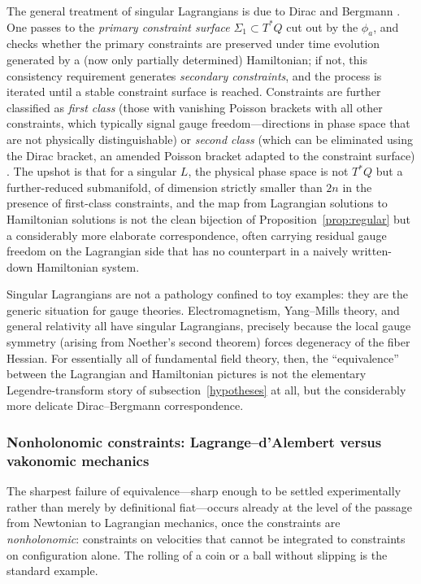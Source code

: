 The general treatment of singular Lagrangians is due to Dirac and Bergmann
\cite{dirac1964}. One passes to the \emph{primary constraint surface}
$\Sigma_1 \subset T^*Q$ cut out by the $\phi_a$, and checks whether the primary
constraints are preserved under time evolution generated by a (now only
partially determined) Hamiltonian; if not, this consistency requirement
generates \emph{secondary constraints}, and the process is iterated until a
stable constraint surface is reached. Constraints are further classified as
\emph{first class} (those with vanishing Poisson brackets with all other
constraints, which typically signal gauge freedom---directions in phase space
that are not physically distinguishable) or \emph{second class} (which can be
eliminated using the Dirac bracket, an amended Poisson bracket adapted to the
constraint surface) \cite{henneauxteitelboim1992}. The upshot is that for a
singular $L$, the physical phase space is not $T^*Q$ but a further-reduced
submanifold, of dimension strictly smaller than $2n$ in the presence of
first-class constraints, and the map from Lagrangian solutions to Hamiltonian
solutions is not the clean bijection of Proposition~\ref{prop:regular} but a
considerably more elaborate correspondence, often carrying residual gauge
freedom on the Lagrangian side that has no counterpart in a naively
written-down Hamiltonian system.

Singular Lagrangians are not a pathology confined to toy examples: they are the
generic situation for gauge theories. Electromagnetism, Yang--Mills theory, and
general relativity all have singular Lagrangians, precisely because the local
gauge symmetry (arising from Noether's second theorem) forces degeneracy of the
fiber Hessian. For essentially all of fundamental field theory, then, the
``equivalence'' between the Lagrangian and Hamiltonian pictures is not the
elementary Legendre-transform story of subsection~\ref{hypotheses} at all, but
the considerably more delicate Dirac--Bergmann correspondence.

\subsubsection{Nonholonomic constraints: Lagrange--d'Alembert versus vakonomic
mechanics}
\label{nonholonomic}

The sharpest failure of equivalence---sharp enough to be settled experimentally
rather than merely by definitional fiat---occurs already at the level of the
passage from Newtonian to Lagrangian mechanics, once the constraints are
\emph{nonholonomic}: constraints on velocities that cannot be integrated to
constraints on configuration alone. The rolling of a coin or a ball without
slipping is the standard example.

